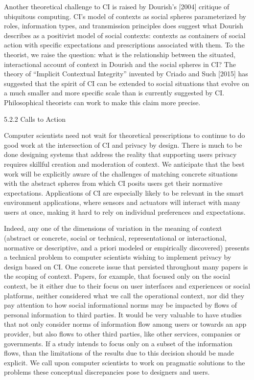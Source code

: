 \documentclass[../thesis.tex]{subfiles}
\begin{document}
Another theoretical challenge to CI is raised by
Dourish's [2004] critique of ubiquitous computing.
CI's model of contexts as social spheres parameterized
by roles, information types, and transmission principles does suggest
what Dourish describes as a positivist model of social contexts:
contexts as containers of social action with specific expectations and
prescriptions associated with them. To the theorist, we raise the
question: what is the relationship between the situated, interactional
account of context in Dourish and the social spheres in CI? The theory
of ``Implicit Contextual Integrity''
invented by Criado and Such [2015] has suggested that the spirit of CI
can be extended to social situations that evolve on a much smaller and
more specific scale than is currently suggested by CI. Philosophical
theorists can work to make this claim more precise.


\bigskip

{\color[rgb]{0.2627451,0.2627451,0.2627451}
5.2.2 Calls to Action}

Computer scientists need not wait for theoretical prescriptions to
continue to do good work at the intersection of CI and privacy by
design. There is much to be done designing systems that address the
reality that supporting users privacy requires skillful creation and
moderation of context. We anticipate that the best work will be
explicitly aware of the challenges of matching concrete situations with
the abstract spheres from which CI posits users get their normative
expectations. Applications of CI are especially likely to be relevant
in the smart environment applications, where sensors and actuators will
interact with many users at once, making it hard to rely on individual
preferences and expectations. 


\bigskip

Indeed, any one of the dimensions of variation in the meaning of context
(abstract or concrete, social or technical, representational or
interactional, normative or descriptive, and a priori modeled or
empirically discovered) presents a technical problem to computer
scientists wishing to implement privacy by design based on CI. One
concrete issue that persisted throughout many papers is the scoping of
context. Papers, for example, that focused only on the social context,
be it either due to their focus on user interfaces and experiences or
social platforms, neither considered what we call the operational
context, nor did they pay attention to how social informational norms
may be impacted by flows of personal information to third parties. It
would be very valuable to have studies that not only consider norms of
information flow among users or towards an app provider, but also flows
to other third parties, like other services, companies or governments.
If a study intends to focus only on a subset of the information flows,
than the limitations of the results due to this decision should be made
explicit. We call upon computer scientists to work on pragmatic
solutions to the problems these conceptual discrepancies pose to
designers and users.
\end{document}
